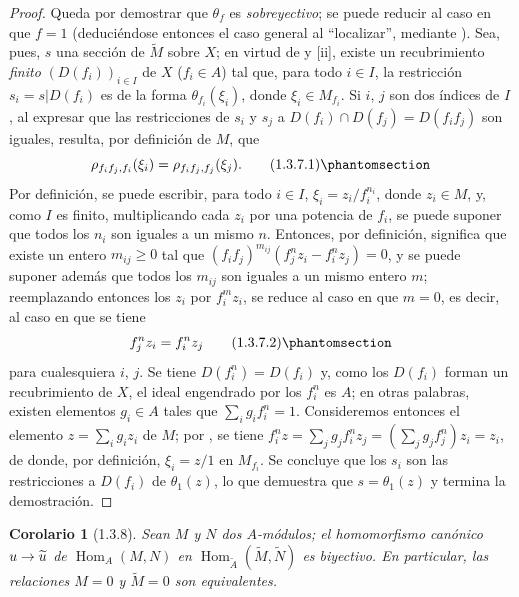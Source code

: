 \documentclass[oneside]{amsart}
\theoremstyle{ega-env-style}
\theoremstyle{ega-thm-env-style}
\newtheorem*{corollary}{Corolario}
\theoremstyle{ega-defn-env-style}
\def\geq{\geqslant}                 %
\renewcommand{\to}{\mathchoice{\longrightarrow}{\rightarrow}{\rightarrow}{\rightarrow}}
\newcommand{\oldpage}[2][]{{\marginnote{\normalfont{\textbf{#1}~|~#2}}}\ignorespaces}
\let\EGAOriginalLabel\label
\renewcommand{\label}[1]{\phantomsection\EGAOriginalLabel{#1}}
\begin{document}
\begin{proof}
Queda por demostrar que $\theta_f$ es \emph{sobreyectivo};
se puede reducir al caso en que $f=1$ (deduciéndose entonces el caso general al ``localizar'', mediante ).
Sea, pues, $s$ una sección de $\widetilde{M}$ sobre $X$;
en virtud de  y [ii], existe un recubrimiento \emph{finito} $(D(f_i))_{i\in I}$ de $X$ ($f_i\in A$) tal que, para todo $i\in I$, la restricción $s_i=s|D(f_i)$ es de la forma $\theta_{f_i}(\xi_i)$, donde $\xi_i\in M_{f_i}$.
Si $i$, $j$ son dos índices de $I$, al expresar que las restricciones de $s_i$ y $s_j$ a $D(f_i)\cap D(f_j)=D(f_i f_j)$ son iguales, resulta, por definición de $M$, que
\begin{equation}
  \rho_{f_i f_j,f_i}(\xi_i)=\rho_{f_i f_j,f_j}(\xi_j).
  \tag{1.3.7.1}\label{I.1.3.7.1-fr}
\end{equation}
Por definición, se puede escribir, para todo $i\in I$, $\xi_i=z_i/f_i^{n_i}$, donde $z_i\in M$, y, como $I$ es finito, multiplicando cada $z_i$ por una potencia de $f_i$, se puede suponer que todos los $n_i$ son iguales a un mismo $n$.
Entonces, por definición,  significa que existe un entero $m_{ij}\geq0$ tal que $(f_i f_j)^{m_{ij}}(f_j^n z_i-f_i^n z_j)=0$, y se puede suponer además que todos los $m_{ij}$ son iguales a un mismo entero $m$;
reemplazando entonces los $z_i$ por $f_i^m z_i$, se reduce al caso en que $m=0$, es decir, al caso en que se tiene
\begin{equation}
  f_j^n z_i=f_i^n z_j
  \tag{1.3.7.2}\label{I.1.3.7.2-fr}
\end{equation}
para cualesquiera $i$, $j$.
Se tiene $D(f_i^n)=D(f_i)$ y, como los $D(f_i)$ forman un recubrimiento de $X$, el ideal engendrado por los $f_i^n$ es $A$;
en otras palabras, existen elementos $g_i\in A$ tales que $\sum_i g_i f_i^n=1$.
Consideremos entonces el elemento $z=\sum_i g_i z_i$ de $M$;
por , se tiene $f_i^n z=\sum_j g_j f_i^n z_j=(\sum_j g_j f_j^n)z_i=z_i$, de donde, por definición, $\xi_i=z/1$ en $M_{f_i}$.
Se concluye
\oldpage[I]{87}
que los $s_i$ son las restricciones a $D(f_i)$ de $\theta_1(z)$, lo que demuestra que $s=\theta_1(z)$ y termina la demostración.
\end{proof}

\begin{corollary}[1.3.8]
\label{I.1.3.8}
Sean $M$ y $N$ dos $A$-módulos;
el homomorfismo canónico $u\to\widetilde{u}$ de $\operatorname{Hom}_A(M,N)$ en $\operatorname{Hom}_{\widetilde{A}}(\widetilde{M},\widetilde{N})$ es biyectivo.
En particular, las relaciones $M=0$ y $\widetilde{M}=0$ son equivalentes.
\end{corollary}
\end{document}
